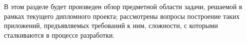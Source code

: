 \label{sec:domain}

В этом разделе будет произведен обзор предметной области задачи, решаемой в рамках текущего дипломного проекта; рассмотрены вопросы построение таких приложений, предъявляемых требований к ним, сложности, с которыми сталкиваются в процессе разработки.


